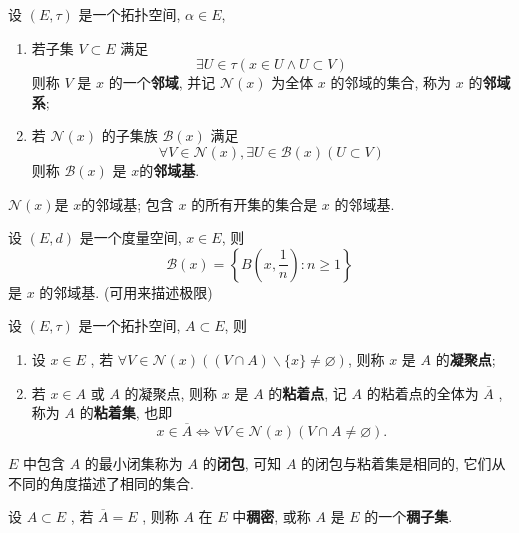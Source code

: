 \documentclass[lang=cn,10pt]{gorgeousnbook}
\numberwithin{equation}{section}%
\numberwithin{figure}{section}%
\begin{document}
\begin{definition}[邻域基]\label{def:邻域基}
   设 $ (E, \tau) $ 是一个拓扑空间, $ \alpha\in E $,
   \begin{enumerate}[(1)]
      \item 若子集 $ V\subset E $ 满足
        \[\exists U\in \tau(x\in U\land U\subset V)\]
      则称 $ V $ 是 $ x $ 的一个\textbf{邻域}, 并记 $ \mathcal{N}(x) $ 为全体 $ x $ 的邻域的集合, 称为 $ x $ 的\textbf{邻域系};
      \item 若 $ \mathcal{N}(x) $ 的子集族 $ \mathcal{B}(x) $ 满足
      \[\forall V\in \mathcal{N}(x), \exists U\in \mathcal{B}(x)(U\subset V)\]
      则称 $ \mathcal{B}(x) $ 是 $ x $的\textbf{邻域基}.
   \end{enumerate}
\end{definition}

\begin{remark}
$ \mathcal{N}(x) $是 $ x $的邻域基; 包含 $ x $ 的所有开集的集合是 $ x $ 的邻域基.
\end{remark}

\begin{exercise}
   设 $ (E, d) $ 是一个度量空间, $ x\in E $, 则
   \[\mathcal{B}(x)=\left\{ B\left(x,\frac{1}{n}\right): n\geqslant 1 \right\}\]
   是 $ x $ 的邻域基. (可用来描述极限)
\end{exercise}
\begin{definition}[粘着集]
   设 $ (E, \tau) $ 是一个拓扑空间, $ A\subset E $, 则
   \begin{enumerate}[(1)]
      \item 设 $ x\in E $ , 若 $ \forall V\in \mathcal{N}(x)((V\cap A)\backslash \{ x \}\neq\varnothing) $, 则称 $ x $ 是 $ A $ 的\textbf{凝聚点};
      \item 若 $ x\in A $ 或 $ A $  的凝聚点, 则称 $ x $ 是 $ A $ 的\textbf{粘着点}, 记 $ A $ 的粘着点的全体为 $ \overline{A} $ , 称为 $ A $ 的\textbf{粘着集}, 也即
      \[ x\in \overline{A}\Leftrightarrow \forall V\in \mathcal{N}(x)(V\cap A\neq\varnothing). \]
   \end{enumerate}
\end{definition}

\begin{remark}
$ E $ 中包含 $ A $ 的最小闭集称为 $ A $ 的\textbf{闭包}, 可知 $ A $ 的闭包与粘着集是相同的, 它们从不同的角度描述了相同的集合.
\end{remark}

\begin{definition}[稠密]\label{def:稠密}
   设 $ A\subset E $ , 若 $ \overline{A}=E $ , 则称 $ A $ 在 $ E $ 中\textbf{稠密}, 或称 $ A $ 是 $ E $ 的一个\textbf{稠子集}.
\end{definition}
\end{document}

